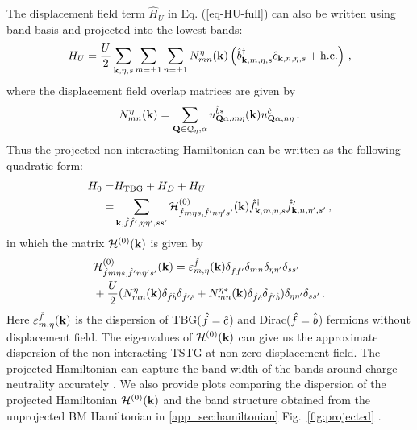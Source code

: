 \documentclass[prb,aps,nofootinbib,amssymb,twocolumn,superscriptaddress,10pt]{revtex4-2}
\begin{document}
The displacement field term $\hat{H}_U$ in Eq. (\ref{eq-HU-full}) can also be written using band basis and projected into the lowest bands:
\begin{equation}\label{eq-HU}
	H_U = \frac{U}{2}\sum_{\mathbf{k}, \eta, s}\sum_{m=\pm1}\sum_{n=\pm1}N^\eta_{mn}(\mathbf{k})\left(\hat{b}^\dagger_{\mathbf{k}, m, \eta, s}\hat{c}_{\mathbf{k}, n, \eta, s} + {\rm h.c.}\right)\,,
\end{equation}
where the displacement field overlap matrices are given by
\begin{equation}
	N^{\eta}_{mn}(\mathbf{k}) = \sum_{\mathbf{Q}\in\mathcal{Q}_\eta, \alpha} u^{\hat{b}*}_{\mathbf{Q}\alpha, m\eta}(\mathbf{k})u^{\hat{c}}_{\mathbf{Q}\alpha, n\eta}\,.
\end{equation}
Thus the projected non-interacting Hamiltonian can be written as the following quadratic form:
\begin{align}
	H_0 =& H_{\rm TBG} + H_D + H_U \nonumber\\
	=& \sum_{\mathbf{k},\hat{f}\hat{f}',\eta\eta',ss'}\mathcal{H}^{(0)}_{\hat{f}m\eta s,\hat{f}'n\eta's'}(\mathbf{k})\hat{f}^\dagger_{\mathbf{k},m,\eta,s}\hat{f}'_{\mathbf{k},n,\eta',s'}\,,\label{eqn:non-interacting-quadratic}
\end{align}
in which the matrix $\mathcal{H}^{(0)}(\mathbf{k})$ is given by
\begin{align}
	&\mathcal{H}^{(0)}_{\hat{f}m\eta s,\hat{f}'n\eta's'}(\mathbf{k}) = \varepsilon_{m,\eta}^{\hat{f}}(\mathbf{k}) \delta_{\hat{f}\hat{f}'}\delta_{mn}\delta_{\eta\eta'}\delta_{ss'}\nonumber\\
	& + \frac{U}{2}(N^{\eta}_{mn}(\mathbf{k})\delta_{\hat{f}\hat{b}}\delta_{\hat{f}'\hat{c}} + N^{\eta*}_{mn}(\mathbf{k})\delta_{\hat{f}\hat{c}}\delta_{\hat{f}'\hat{b}})\delta_{\eta\eta'}\delta_{ss'}\,.\label{eqn:non-interacting-H0}
\end{align}
Here $\varepsilon_{m,\eta}^{\hat{f}}(\mathbf{k})$ is the dispersion of TBG($\hat{f} = \hat{c}$) and Dirac($\hat{f} = \hat{b}$) fermions without displacement field. The eigenvalues of $\mathcal{H}^{(0)}(\mathbf{k})$ can give us the approximate dispersion of the non-interacting TSTG at non-zero displacement field.
The projected Hamiltonian can capture the band width of the bands around charge neutrality accurately \cite{TSTGI}. We also provide plots comparing the dispersion of the projected Hamiltonian $\mathcal{H}^{(0)}(\mathbf{k})$ and the band structure obtained from the unprojected BM Hamiltonian in \ref{app_sec:hamiltonian} Fig.~\ref{fig:projected} \cite{TSTGI}. 
\end{document}
